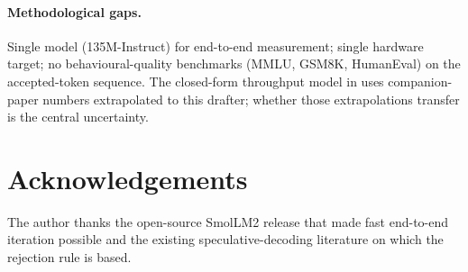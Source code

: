 \documentclass[11pt]{article}
\begin{document}
\paragraph{Methodological gaps.}  Single model (135M-Instruct) for
end-to-end measurement; single hardware target; no behavioural-quality
benchmarks (MMLU, GSM8K, HumanEval) on the accepted-token sequence.  The
closed-form throughput model in  uses
companion-paper numbers extrapolated to this drafter; whether those
extrapolations transfer is the central uncertainty.

\section*{Acknowledgements}
The author thanks the open-source SmolLM2 release that made fast
end-to-end iteration possible and the existing speculative-decoding
literature on which the rejection rule is based.

\printbibliography
\end{document}
